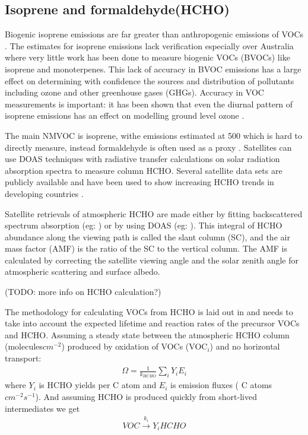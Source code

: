 \subsection{Isoprene and formaldehyde(HCHO)}

Biogenic isoprene emissions are far greater than anthropogenic emissions of VOCs \cite{Guenther_2006}. 
The estimates for isoprene emissions lack verification especially over Australia where very little work has been done to measure biogenic VOCs (BVOCs) like isoprene and monoterpenes.
This lack of accuracy in BVOC emissions has a large effect on determining with confidence the sources and distribution of pollutants including ozone and other greenhouse gases (GHGs).
Accuracy in VOC measurements is important: it has been shown that even the diurnal pattern of isoprene emissions has an effect on modelling ground level ozone \cite{Hewitt_2011}.

The main NMVOC is isoprene, withe emissions estimated at 500\tgyr \cite{Guenther_2006} which is hard to directly measure, instead formaldehyde is often used as a proxy \cite{Marais_2012,bauwens2013satellite}.
Satellites can use DOAS techniques with radiative transfer calculations on solar radiation absorption spectra to measure column HCHO.
Several satellite data sets are publicly available and have been used to show increasing HCHO trends in developing countries \cite{Mahajan_2015}.

Satellite retrievals of atmospheric HCHO are made either by fitting backscattered spectrum absorption (eg: \citet{Chance_2000}) or by using DOAS (eg: \citet{leue_2001}).
This integral of HCHO abundance along the viewing path is called the slant column (SC), and the air mass factor (AMF) is the ratio of the SC to the vertical column.
The AMF is calculated by correcting the satellite viewing angle and the solar zenith angle for atmospheric scattering and surface albedo.

(TODO: more info on HCHO calculation?)

The methodology for calculating VOCs from HCHO is laid out in \citet{Palmer_2003} and needs to take into account the expected lifetime and reaction rates of the precursor VOCs and HCHO.
Assuming a steady state between the atmospheric HCHO column (\Omega molecules$cm^{-2}$)  produced by oxidation of VOCs (VOC$_i$) and no horizontal transport:
\begin{eqnarray*}
\Omega = \frac{1}{k_{HCHO}} \sum_{i} Y_i E_i
\end{eqnarray*}
where $Y_i$ is HCHO yields per C atom and $E_i$ is emission fluxes ( C atoms $cm^{-2}s^{-1}$).
And assuming HCHO is produced quickly from short-lived intermediates we get
\begin{eqnarray*}
VOC \overset{k_i}{\rightarrow} Y_i HCHO
\end{eqnarray*}

